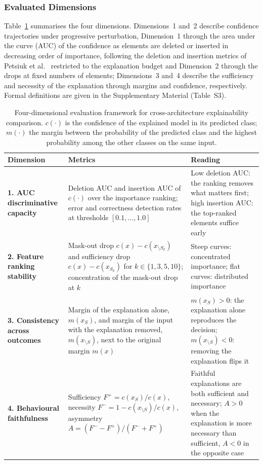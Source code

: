 \subsubsection{Evaluated Dimensions}

Table~\ref{tab:evaluation_dimensions} summarises the four dimensions. Dimensions~1 and~2 describe confidence trajectories under progressive perturbation, Dimension~1 through the area under the curve (AUC) of the confidence as elements are deleted or inserted in decreasing order of importance, following the deletion and insertion metrics of Petsiuk et al.~\cite{petsiuk2018rise} restricted to the explanation budget and Dimension~2 through the drops at fixed numbers of elements; Dimensions~3 and~4 describe the sufficiency and necessity of the explanation through margins and confidence, respectively. Formal definitions are given in the Supplementary Material (Table~S3).

\begin{table}[!tbp]
\centering
\scriptsize
\setlength{\tabcolsep}{4pt}
\renewcommand{\arraystretch}{1.1}
\caption{Four-dimensional evaluation framework for cross-architecture explainability comparison. \(c(\cdot)\) is the confidence of the explained model in its predicted class; \(m(\cdot)\) the margin between the probability of the predicted class and the highest probability among the other classes on the same input.}
\label{tab:evaluation_dimensions}
\begin{tabular}{@{}p{}p{}p{}@{}}
\toprule
\textbf{Dimension} & \textbf{Metrics} & \textbf{Reading} \\
\midrule
\textbf{1. AUC discriminative capacity}
& Deletion AUC and insertion AUC of \(c(\cdot)\) over the importance ranking; error and correctness detection rates at thresholds \([0.1,\ldots,1.0]\)
& Low deletion AUC: the ranking removes what matters first; high insertion AUC: the top-ranked elements suffice early \\
\midrule
\textbf{2. Feature ranking stability}
& Mask-out drop \(c(x)-c(x_{\setminus S_k})\) and sufficiency drop \(c(x)-c(x_{S_k})\) for \(k\in\{1,3,5,10\}\); concentration of the mask-out drop at \(k\)
& Steep curves: concentrated importance; flat curves: distributed importance \\
\midrule
\textbf{3. Consistency across outcomes}
& Margin of the explanation alone, \(m(x_S)\), and margin of the input with the explanation removed, \(m(x_{\setminus S})\), next to the original margin \(m(x)\)
& \(m(x_S)>0\): the explanation alone reproduces the decision; \(m(x_{\setminus S})<0\): removing the explanation flips it \\
\midrule
\textbf{4. Behavioural faithfulness}
& Sufficiency \(F^{+}=c(x_S)/c(x)\), necessity \(F^{-}=1-c(x_{\setminus S})/c(x)\), asymmetry \(A=(F^{-}-F^{+})/(F^{-}+F^{+})\)
& Faithful explanations are both sufficient and necessary; \(A>0\) when the explanation is more necessary than sufficient, \(A<0\) in the opposite case \\
\bottomrule
\end{tabular}
\end{table}

